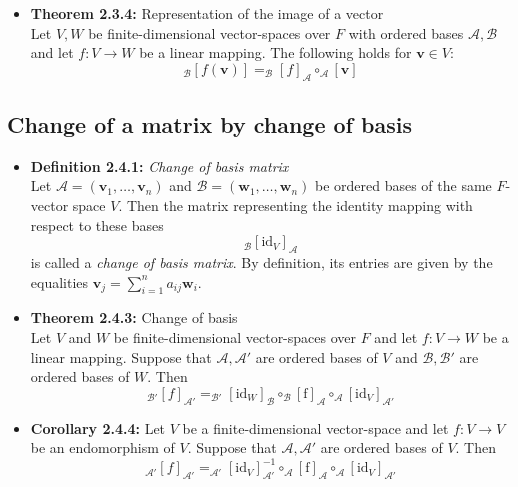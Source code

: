 \documentclass[11pt,a4paper]{article}
\begin{document}
\begin{itemize}
    \item \textbf{Theorem 2.3.4:} Representation of the image of a vector \\
        Let $V,W$ be finite-dimensional vector-spaces over $F$ with ordered bases $\mathcal{A,B}$
        and let $f : V \to W$ be a linear mapping.
        The following holds for $\textbf{v} \in V$:
        \[
            _\mathcal{B}{[f(\textbf{v})]} = _\mathcal{B}{[f]}_\mathcal{A} \circ
            _\mathcal{A}[\textbf{v}]
        \]
\end{itemize}

\subsection{Change of a matrix by change of basis}

\begin{itemize}

    \item \textbf{Definition 2.4.1:} \emph{Change of basis matrix} \\
        Let $\mathcal{A} = (\textbf{v}_1, \ldots, \textbf{v}_n)$ and $\mathcal{B} =
        (\textbf{w}_1, \ldots, \textbf{w}_n)$
        be ordered bases of the same $F$-vector space $V$.
        Then the matrix representing the identity mapping with respect to these bases
        \[
            _\mathcal{B}{[\mathrm{id}_V]}_\mathcal{A}
        \]
        is called a \emph{change of basis matrix}.
        By definition, its entries are given by the equalities $\textbf{v}_j =
        \sum_{i=1}^n a_{ij}\textbf{w}_i$.

    \item \textbf{Theorem 2.4.3:} Change of basis \\
        Let $V$ and $W$ be finite-dimensional vector-spaces over $F$ and let $f : V \to W$
        be a linear mapping.
        Suppose that $\mathcal{A, A'}$ are ordered bases of $V$ and $\mathcal{B, B'}$
        are ordered bases of $W$.
        Then
        \[
            _\mathcal{B'}{[f]}_\mathcal{A'} = _\mathcal{B'}{[\mathrm{id}_W]}_\mathcal{B} \circ
            _\mathcal{B}{[\mathrm{f}]}_\mathcal{A} \circ _\mathcal{A}{[\mathrm{id}_V]}_\mathcal{A'}
        \]

    \item \textbf{Corollary 2.4.4:}
        Let $V$ be a finite-dimensional vector-space and let
        $f : V \to V$ be an endomorphism of $V$.
        Suppose that $\mathcal{A, A'}$ are ordered bases of $V$.
        Then
        \[
            _\mathcal{A'}{[f]}_\mathcal{A'} = _\mathcal{A'}{[\mathrm{id}_V]}^{-1}_\mathcal{A'}
            \circ _\mathcal{A}{[\mathrm{f}]}_\mathcal{A} \circ _\mathcal{A}
            {[\mathrm{id}_V]}_\mathcal{A'}
        \]


\end{itemize}
\end{document}
